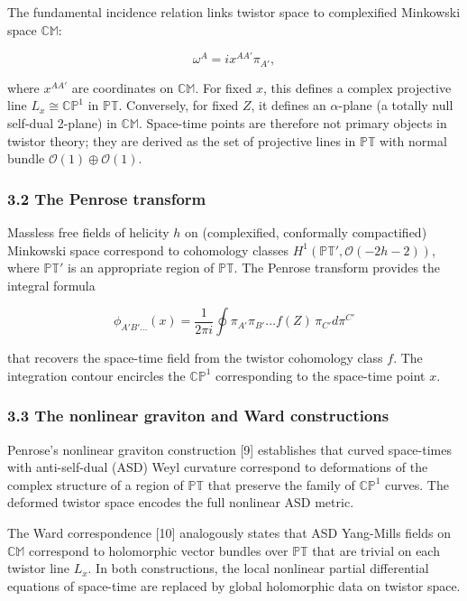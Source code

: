\documentclass[
  11pt,
  letterpaper,
]{article}
\begin{document}
The fundamental incidence relation links twistor space to complexified
Minkowski space \(\mathbb{CM}\):

\[
\omega^A = i x^{AA'} \pi_{A'},
\]

where \(x^{AA'}\) are coordinates on \(\mathbb{CM}\). For fixed \(x\),
this defines a complex projective line \(L_x \cong \mathbb{CP}^1\) in
\(\mathbb{PT}\). Conversely, for fixed \(Z\), it defines an
\(\alpha\)-plane (a totally null self-dual 2-plane) in \(\mathbb{CM}\).
Space-time points are therefore not primary objects in twistor theory;
they are derived as the set of projective lines in \(\mathbb{PT}\) with
normal bundle \(\mathcal{O}(1) \oplus \mathcal{O}(1)\).

\subsubsection{3.2 The Penrose transform}\label{the-penrose-transform}

Massless free fields of helicity \(h\) on (complexified, conformally
compactified) Minkowski space correspond to cohomology classes
\(H^1(\mathbb{PT}', \mathcal{O}(-2h-2))\), where \(\mathbb{PT}'\) is an
appropriate region of \(\mathbb{PT}\). The Penrose transform provides
the integral formula

\[
\phi_{A'B'\dots}(x) = \frac{1}{2\pi i} \oint \pi_{A'} \pi_{B'} \dots f(Z) \, \pi_{C'} d\pi^{C'}
\]

that recovers the space-time field from the twistor cohomology class
\(f\). The integration contour encircles the \(\mathbb{CP}^1\)
corresponding to the space-time point \(x\).

\subsubsection{3.3 The nonlinear graviton and Ward
constructions}\label{the-nonlinear-graviton-and-ward-constructions}

Penrose's nonlinear graviton construction {[}9{]} establishes that
curved space-times with anti-self-dual (ASD) Weyl curvature correspond
to deformations of the complex structure of a region of \(\mathbb{PT}\)
that preserve the family of \(\mathbb{CP}^1\) curves. The deformed
twistor space encodes the full nonlinear ASD metric.

The Ward correspondence {[}10{]} analogously states that ASD Yang-Mills
fields on \(\mathbb{CM}\) correspond to holomorphic vector bundles over
\(\mathbb{PT}\) that are trivial on each twistor line \(L_x\). In both
constructions, the local nonlinear partial differential equations of
space-time are replaced by global holomorphic data on twistor space.
\end{document}
